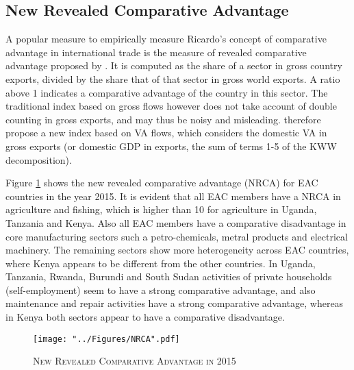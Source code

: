\documentclass[a4paper]{article}
\begin{document}
\subsection{New Revealed Comparative Advantage}
A popular measure to empirically measure Ricardo's concept of comparative advantage in international trade is the measure of revealed comparative advantage proposed by \citet{balassa1965trade}. It is computed as the share of a sector in gross country exports, divided by the share that of that sector in gross world exports. A ratio above 1 indicates a comparative advantage of the country in this sector. The traditional index based on gross flows however does not take account of double counting in gross exports, and may thus be noisy and misleading. \citet{koopman2014tracing} therefore propose a new index based on VA flows, which considers the domestic VA in gross exports (or domestic GDP in exports, the sum of terms 1-5 of the KWW decomposition). \newline

Figure \ref{fig:NRCA} shows the new revealed comparative advantage (NRCA) for EAC countries in the year 2015. It is evident that all EAC members have a NRCA in agriculture and fishing, which is higher than 10 for agriculture in Uganda, Tanzania and Kenya. Also all EAC members have a comparative disadvantage in core manufacturing sectors such a petro-chemicals, metral products and electrical machinery. The remaining sectors show more heterogeneity across EAC countries, where Kenya appears to be different from the other countries. In Uganda, Tanzania, Rwanda, Burundi and South Sudan activities of private households (self-employment) seem to have a strong comparative advantage, and also maintenance and repair activities have a strong comparative advantage, whereas in Kenya both sectors appear to have a comparative disadvantage. \newline

\begin{figure}[h!]
\centering
\caption{\label{fig:NRCA}\textsc{New Revealed Comparative Advantage in 2015}}
\texttt{[image: "../Figures/NRCA".pdf]} %
\end{figure}
\FloatBarrier
\end{document}
